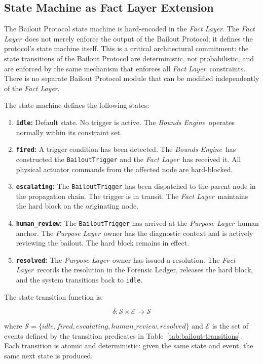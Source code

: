 \documentclass[12pt]{article}
\newcommand{\purpose}{\textit{Purpose Layer}}
\newcommand{\bounds}{\textit{Bounds Engine}}
\newcommand{\fact}{\textit{Fact Layer}}
\begin{document}
\subsection{State Machine as Fact Layer Extension}
\label{sec:state-machine}

The Bailout Protocol state machine is hard-encoded in the \fact. The \fact\ does not merely enforce the output of the Bailout Protocol; it defines the protocol's state machine itself. This is a critical architectural commitment: the state transitions of the Bailout Protocol are deterministic, not probabilistic, and are enforced by the same mechanism that enforces all \fact\ constraints. There is no separate Bailout Protocol module that can be modified independently of the \fact.

The state machine defines the following states:

\begin{enumerate}
\item \textbf{\texttt{idle}:} Default state. No trigger is active. The \bounds\ operates normally within its constraint set.
\item \textbf{\texttt{fired}:} A trigger condition has been detected. The \bounds\ has constructed the \texttt{BailoutTrigger} and the \fact\ has received it. All physical actuator commands from the affected node are hard-blocked.
\item \textbf{\texttt{escalating}:} The \texttt{BailoutTrigger} has been dispatched to the parent node in the propagation chain. The trigger is in transit. The \fact\ maintains the hard block on the originating node.
\item \textbf{\texttt{human\_review}:} The \texttt{BailoutTrigger} has arrived at the \purpose\ human anchor. The \purpose\ owner has the diagnostic context and is actively reviewing the bailout. The hard block remains in effect.
\item \textbf{\texttt{resolved}:} The \purpose\ owner has issued a resolution. The \fact\ records the resolution in the Forensic Ledger, releases the hard block, and the system transitions back to \texttt{idle}.
\end{enumerate}

The state transition function is:

\begin{equation}
\delta: \mathcal{S} \times \mathcal{E} \rightarrow \mathcal{S}
\end{equation}

where $\mathcal{S} = \{idle, fired, escalating, human\_review, resolved\}$ and $\mathcal{E}$ is the set of events defined by the transition predicates in Table~\ref{tab:bailout-transitions}. Each transition is atomic and deterministic: given the same state and event, the same next state is produced.
\end{document}

